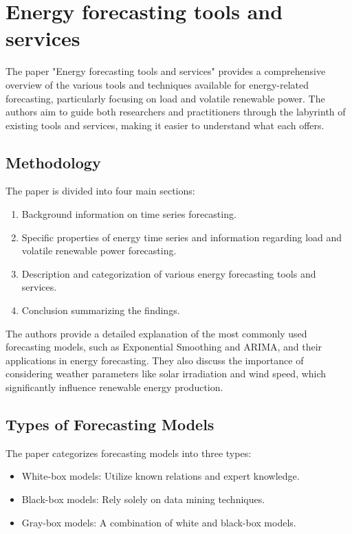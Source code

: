\documentclass{article}
\begin{document}
\newpage
\section{Energy forecasting tools and services}

The paper "Energy forecasting tools and services" provides a comprehensive overview of the various tools and techniques available for energy-related forecasting, particularly focusing on load and volatile renewable power. The authors aim to guide both researchers and practitioners through the labyrinth of existing tools and services, making it easier to understand what each offers.

\subsection{Methodology}

The paper is divided into four main sections:
\begin{enumerate}
    \item Background information on time series forecasting.
    \item Specific properties of energy time series and information regarding load and volatile renewable power forecasting.
    \item Description and categorization of various energy forecasting tools and services.
    \item Conclusion summarizing the findings.
\end{enumerate}

The authors provide a detailed explanation of the most commonly used forecasting models, such as Exponential Smoothing and ARIMA, and their applications in energy forecasting. They also discuss the importance of considering weather parameters like solar irradiation and wind speed, which significantly influence renewable energy production.

\subsection{Types of Forecasting Models}

The paper categorizes forecasting models into three types:

\begin{itemize}
    \item White-box models: Utilize known relations and expert knowledge.
    \item Black-box models: Rely solely on data mining techniques.
    \item Gray-box models: A combination of white and black-box models.
\end{itemize}
\end{document}
